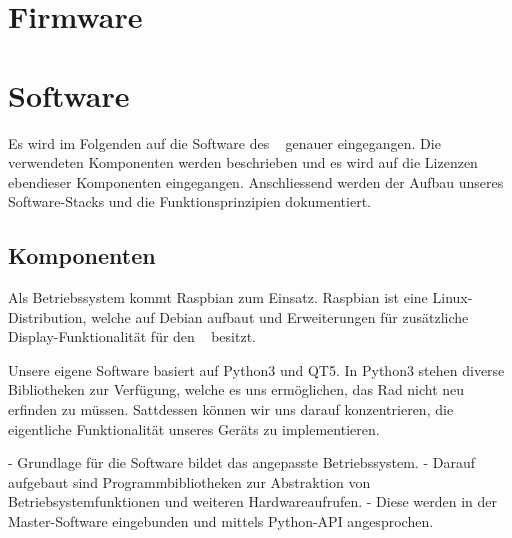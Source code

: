 \section{Firmware \Sensor}
\label{sec:firmware:sensor}



\section{Software \Master}
\label{sec:software:master}

Es wird  im Folgenden auf  die Software des \Master~  genauer eingegangen. Die
verwendeten  Komponenten  werden beschrieben  und  es  wird auf  die  Lizenzen
ebendieser  Komponenten eingegangen. Anschliessend  werden der  Aufbau unseres
Software-Stacks und die Funktionsprinzipien dokumentiert.


\subsection{Komponenten}
\label{subsec:software:master:components}

Als   Betriebssystem   kommt   Raspbian   zum   Einsatz. Raspbian   ist   eine
Linux-Distribution,  welche auf  Debian   aufbaut  und
Erweiterungen f\"ur  zus\"atzliche Display-Funktionalit\"at f\"ur  den \Raspi~
besitzt.

Unsere eigene Software basiert auf  Python3 und QT5. In Python3 stehen diverse
Bibliotheken   zur  Verf\"ugung,  welche  es uns  erm\"oglichen,
das  Rad  nicht   neu  erfinden  zu  m\"ussen. Sattdessen   k\"onnen  wir  uns
darauf  konzentrieren, die  eigentliche Funktionalit\"at  unseres Ger\"ats  zu
implementieren.



 - Grundlage für die Software bildet das angepasste Betriebssystem.
 - Darauf aufgebaut sind Programmbibliotheken zur Abstraktion von Betriebsystemfunktionen und weiteren Hardwareaufrufen.
 - Diese werden in der Master-Software eingebunden und mittels Python-API angesprochen.


